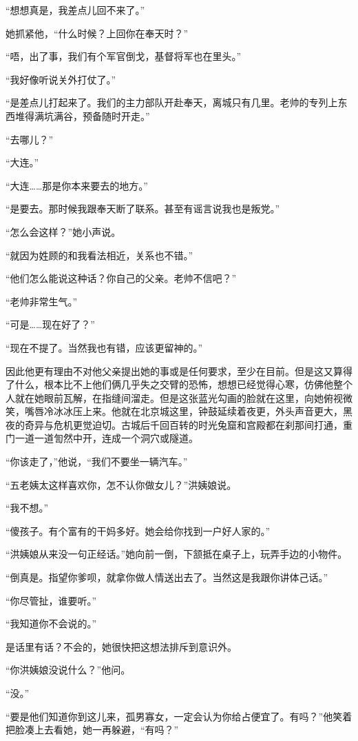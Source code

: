 \par “想想真是，我差点儿回不来了。”
\par 她抓紧他，“什么时候？上回你在奉天时？”
\par “唔，出了事，我们有个军官倒戈，基督将军也在里头。”
\par “我好像听说关外打仗了。”
\par “是差点儿打起来了。我们的主力部队开赴奉天，离城只有几里。老帅的专列上东西堆得满坑满谷，预备随时开走。”
\par “去哪儿？”
\par “大连。”
\par “大连……那是你本来要去的地方。”
\par “是要去。那时候我跟奉天断了联系。甚至有谣言说我也是叛党。”
\par “怎么会这样？”她小声说。
\par “就因为姓顾的和我看法相近，关系也不错。”
\par “他们怎么能说这种话？你自己的父亲。老帅不信吧？”
\par “老帅非常生气。”
\par “可是……现在好了？”
\par “现在不提了。当然我也有错，应该更留神的。”
\par 因此他更有理由不对他父亲提出她的事或是任何要求，至少在目前。但是这又算得了什么，根本比不上他们俩几乎失之交臂的恐怖，想想已经觉得心寒，仿佛他整个人就在她眼前瓦解，在指缝间溜走。但是这张蓝光勾画的脸就在这里，向她俯视微笑，嘴唇冷冰冰压上来。他就在北京城这里，钟鼓延续着夜更，外头声音更大，黑夜的奇异与危机更觉迫切。古城后千回百转的时光兔窟和宫殿都在刹那间打通，重门一道一道訇然中开，连成一个洞穴或隧道。
\par “你该走了，”他说，“我们不要坐一辆汽车。”
\par “五老姨太这样喜欢你，怎不认你做女儿？”洪姨娘说。
\par “我不想。”
\par “傻孩子。有个富有的干妈多好。她会给你找到一户好人家的。”
\par “洪姨娘从来没一句正经话。”她向前一倒，下颔抵在桌子上，玩弄手边的小物件。
\par “倒真是。指望你爹呗，就拿你做人情送出去了。当然这是我跟你讲体己话。”
\par “你尽管扯，谁要听。”
\par “我知道你不会说的。”
\par 是话里有话？不会的，她很快把这想法排斥到意识外。
\par “你洪姨娘没说什么？”他问。
\par “没。”
\par “要是他们知道你到这儿来，孤男寡女，一定会认为你给占便宜了。有吗？”他笑着把脸凑上去看她，她一再躲避，“有吗？”
